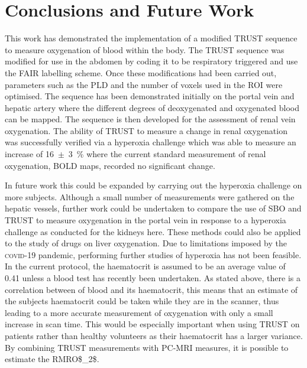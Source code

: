 \newpage
\section{Conclusions and Future Work}

This work has demonstrated the implementation of a modified \ac{TRUST} sequence to measure oxygenation of blood within the body. The \ac{TRUST} sequence was modified for use in the abdomen by coding it to be respiratory triggered and use the \ac{FAIR} labelling scheme. Once these modifications had been carried out, parameters such as the \ac{PLD} and the number of voxels used in the \ac{ROI} were optimised. The sequence has been demonstrated initially on the portal vein and hepatic artery where the different degrees of deoxygenated and oxygenated blood can be mapped. The sequence is then developed for the assessment of renal vein oxygenation. The ability of \ac{TRUST} to measure a change in renal oxygenation was successfully verified via a hyperoxia challenge which was able to measure an increase of 16~$\pm$~3~\% where the current standard measurement of renal oxygenation, \ac{BOLD} \ttwostar maps, recorded no significant change.

In future work this could be expanded by carrying out the hyperoxia challenge on more subjects. Although a small number of measurements were gathered on the hepatic vessels, further work could be undertaken to compare the use of \ac{SBO} and \ac{TRUST} to measure oxygenation in the portal vein in response to a hyperoxia challenge as conducted for the kidneys here. These methods could also be applied to the study of drugs on liver oxygenation. Due to limitations imposed by the \textsc{covid}-19 pandemic, performing further studies of hyperoxia has not been feasible. In the current protocol, the haematocrit is assumed to be an average value of 0.41 unless a blood test has recently been undertaken. As stated above, there is a correlation between \tone of blood and its haematocrit, this means that an estimate of the subjects haematocrit could be taken while they are in the scanner, thus leading to a more accurate measurement of oxygenation with only a small increase in scan time. This would be especially important when using \ac{TRUST} on patients rather than healthy volunteers as their haematocrit has a larger variance. By combining \ac{TRUST} measurements with \ac{PC}-\ac{MRI} measures, it is possible to estimate the \acf{RMRO$_2$}.

